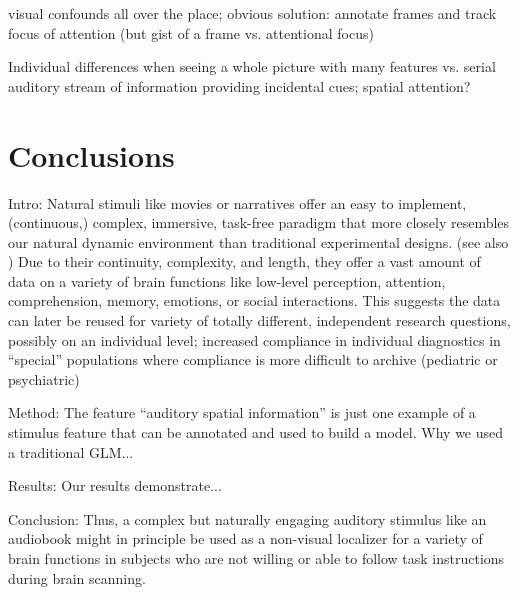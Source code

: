 \documentclass[english]{article}
\begin{document}

visual confounds all over the place; obvious solution: annotate frames and track
focus of attention (but gist of a frame vs. attentional focus)

Individual differences when seeing a whole picture with many features vs. serial
auditory stream of information providing incidental cues; spatial attention?






\section{Conclusions}


Intro: Natural stimuli like movies \citep{hasson2008neurocinematics,
sonkusare2019naturalistic} or narratives \citep{honey2012not,
lerner2011topographic, silbert2014coupled} offer an easy to implement,
(continuous,) complex, immersive, task-free paradigm that more closely resembles
our natural dynamic environment than traditional experimental designs.
(see also \citep{sonkusare2019naturalistic, eickhoff2020towards,
hamilton2018revolution})
Due to their continuity, complexity, and length, they offer a vast amount of
data on a variety of brain functions like low-level perception, attention,
comprehension, memory, emotions, or social interactions. This suggests the data
can later be reused for variety of totally different, independent research
questions, possibly on an individual level; increased compliance in individual
diagnostics in ``special'' populations where compliance is more difficult to
archive (pediatric or psychiatric)

Method: The feature ``auditory spatial information'' is just one example of a
stimulus feature that can be annotated and used to build a model.
Why we used a traditional GLM...

Results: Our results demonstrate...

Conclusion: Thus, a complex but naturally engaging auditory stimulus like an
audiobook might in principle be used as a non-visual localizer for a variety of
brain functions in subjects who are not willing or able to follow task
instructions during brain scanning.
\end{document}
